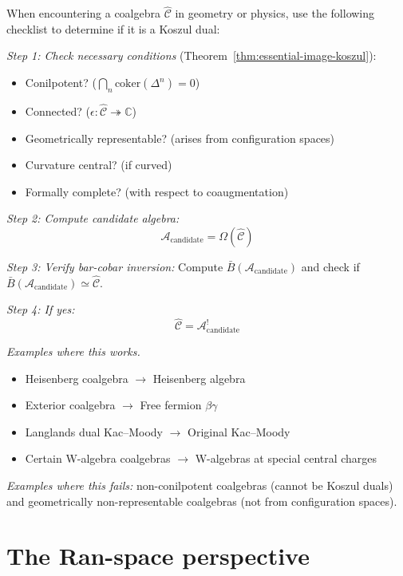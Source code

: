 \begin{remark}\label{rem:identify-koszul-wild}
When encountering a coalgebra $\widehat{\mathcal{C}}$ in geometry or physics, use 
the following checklist to determine if it is a Koszul dual:

\emph{Step 1: Check necessary conditions} (Theorem~\ref{thm:essential-image-koszul}):
\begin{itemize}
\item[$\square$] Conilpotent? ($\bigcap_n \text{coker}(\Delta^n) = 0$)
\item[$\square$] Connected? ($\epsilon: \widehat{\mathcal{C}} \twoheadrightarrow \mathbb{C}$)
\item[$\square$] Geometrically representable? (arises from configuration spaces)
\item[$\square$] Curvature central? (if curved)
\item[$\square$] Formally complete? (with respect to coaugmentation)
\end{itemize}

\emph{Step 2: Compute candidate algebra:}
\[\mathcal{A}_{\text{candidate}} = \Omega(\widehat{\mathcal{C}})\]

\emph{Step 3: Verify bar-cobar inversion:} Compute $\bar{B}(\mathcal{A}_{\text{candidate}})$ and check if $\bar{B}(\mathcal{A}_{\text{candidate}}) \simeq \widehat{\mathcal{C}}$.

\emph{Step 4: If yes:}
\[\widehat{\mathcal{C}} = \mathcal{A}_{\text{candidate}}^!\]

\emph{Examples where this works.}
\begin{itemize}
\item Heisenberg coalgebra $\to$ Heisenberg algebra
\item Exterior coalgebra $\to$ Free fermion $\beta\gamma$
\item Langlands dual Kac--Moody $\to$ Original Kac--Moody
\item Certain W-algebra coalgebras $\to$ W-algebras at special central charges
\end{itemize}

\emph{Examples where this fails:} non-conilpotent coalgebras (cannot be Koszul duals) and geometrically non-representable coalgebras (not from configuration spaces).
\end{remark}

\section{The Ran-space perspective}
\label{sec:ran-space-perspective}

